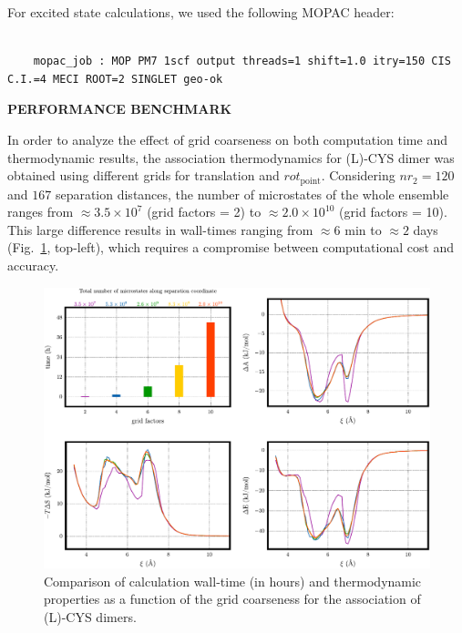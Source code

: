\documentclass[10pt,a4paper]{report}
\begin{document}
  For excited state calculations, we used the following MOPAC header:

\begin{center}
  \begin{minipage}{0.95\textwidth}
    \vskip0.25cm
    \begin{verbatim}

    mopac_job : MOP PM7 1scf output threads=1 shift=1.0 itry=150 CIS C.I.=4 MECI ROOT=2 SINGLET geo-ok 

    \end{verbatim}
  \end{minipage}%
\end{center}

\clearpage

\begin{center}
  \textbf{PERFORMANCE BENCHMARK}
\end{center}

  In order to analyze the effect of grid coarseness on both computation time and
thermodynamic results, the association thermodynamics for (L)-CYS dimer was
obtained using different grids for translation and $rot_{\text{point}}$.
Considering $nr_{\text{2}} = 120$ and $167$ separation distances, the number of
microstates of the whole ensemble ranges from $\approx 3.5 \times 10^{7}$ (grid
factors = 2) to $\approx 2.0 \times 10^{10}$ (grid factors = 10). This
large difference results in wall-times ranging from $\approx 6$ min to $\approx
2$ days (Fig.~\ref{fig:benchmark}, top-left), which requires a compromise
between computational cost and accuracy.

\begin{figure}[!h]
  \includegraphics[width=1.0\textwidth]{figures/benchmark_cys.pdf}
  \caption{Comparison of calculation wall-time (in hours) and thermodynamic
           properties as a function of the grid coarseness for the association 
           of (L)-CYS dimers.}
  \label{fig:benchmark}
\end{figure}
\end{document}

